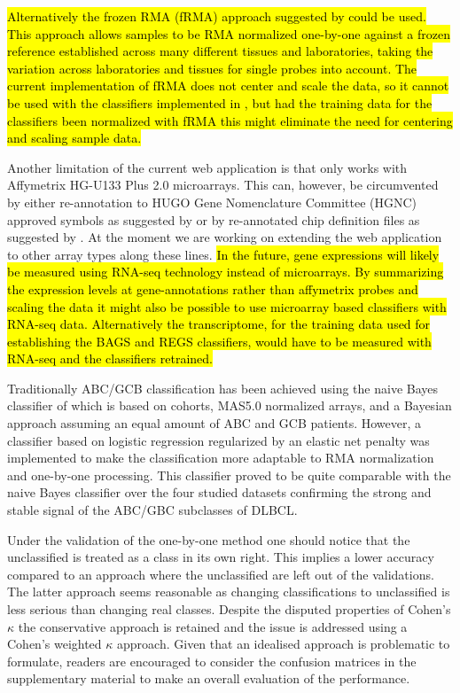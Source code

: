 \documentclass{article}
\begin{document}
\hl{Alternatively the frozen RMA (fRMA) approach suggested by \mbox{\citet{McCall2010}} could be used. This approach allows samples to be RMA normalized one-by-one against a frozen reference established across many different tissues and laboratories, taking the variation across laboratories and tissues for single probes into account. The current implementation of fRMA does not center and scale the data, so it cannot be used with the classifiers implemented in \hemaClass{}, but had the training data for the classifiers been normalized with fRMA this might eliminate the need for centering and scaling sample data.}

Another limitation of the current web application is that \hemaClass{} only works with Affymetrix HG-U133 Plus 2.0 microarrays. This can, however, be circumvented by either re-annotation to HUGO Gene Nomenclature Committee (HGNC) approved symbols as suggested by \citet{Care2013} or by re-annotated chip definition files as suggested by \citet{Dai2005}. At the moment we are working on extending the web application to other array types along these lines. \hl{In the future, gene expressions will likely be measured using RNA-seq technology instead of microarrays. By summarizing the expression levels at gene-annotations rather than affymetrix probes and scaling the data it might also be possible to use microarray based classifiers with RNA-seq data. Alternatively the transcriptome, for the training data used for establishing the BAGS and REGS classifiers, would have to be measured with RNA-seq and the classifiers retrained.}

Traditionally ABC/GCB classification has been achieved using the naive Bayes classifier of \citet{Wright2003} which is based on cohorts, MAS5.0 normalized arrays, and a Bayesian approach assuming an equal amount of ABC and GCB patients.
However, a classifier based on logistic regression regularized by an elastic net penalty was implemented to make the classification more adaptable to RMA normalization and one-by-one processing.
This classifier proved to be quite comparable with the naive Bayes classifier over the four studied datasets confirming the strong and stable signal of the ABC/GBC subclasses of DLBCL.

Under the validation of the one-by-one method one should notice that the unclassified is treated as a class in its own right.
This implies a lower accuracy compared to an approach where the unclassified are left out of the validations.
The latter approach seems reasonable as changing classifications to unclassified is less serious than changing real classes.
Despite the disputed properties of Cohen's $\kappa$ the conservative approach is retained and the issue is addressed using a Cohen's weighted $\kappa$ approach.
Given that an idealised approach is problematic to formulate, readers are encouraged to consider the confusion matrices in the supplementary material to make an overall evaluation of the performance.
\end{document}
